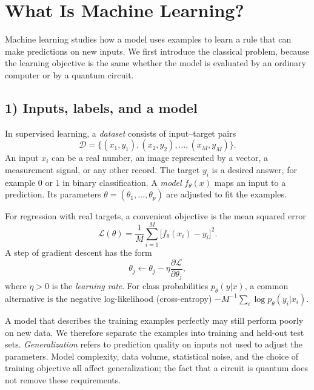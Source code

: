\section{What Is Machine Learning?}
Machine learning studies how a model uses examples to learn a rule that can make predictions on new inputs. We first introduce the classical problem, because the learning objective is the same whether the model is evaluated by an ordinary computer or by a quantum circuit.

\subsection*{1) Inputs, labels, and a model}
In supervised learning, a \emph{dataset} consists of input--target pairs
\begin{equation}
\mathcal D=\{(x_1,y_1),(x_2,y_2),\ldots,(x_M,y_M)\}.
\end{equation}
An input $x_i$ can be a real number, an image represented by a vector, a measurement signal, or any other record. The target $y_i$ is a desired answer, for example $0$ or $1$ in binary classification. A \emph{model} $f_\theta(x)$ maps an input to a prediction. Its parameters $\theta=(\theta_1,\ldots,\theta_p)$ are adjusted to fit the examples.

For regression with real targets, a convenient objective is the mean squared error
\begin{equation}\label{eq:ml-mse}
\mathcal L(\theta)=\frac1M\sum_{i=1}^M\bigl[f_\theta(x_i)-y_i\bigr]^2.
\end{equation}
A step of gradient descent has the form
\begin{equation}
 \theta_j\longleftarrow\theta_j-\eta\frac{\partial\mathcal L}{\partial\theta_j},
\end{equation}
where $\eta>0$ is the \emph{learning rate}. For class probabilities $p_\theta(y|x)$, a common alternative is the negative log-likelihood (cross-entropy) $-M^{-1}\sum_i\log p_\theta(y_i|x_i)$.

A model that describes the training examples perfectly may still perform poorly on new data. We therefore separate the examples into training and held-out test sets. \emph{Generalization} refers to prediction quality on inputs not used to adjust the parameters. Model complexity, data volume, statistical noise, and the choice of training objective all affect generalization; the fact that a circuit is quantum does not remove these requirements.

